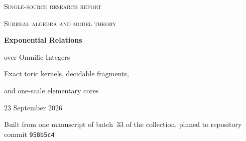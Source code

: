 \documentclass[11pt,letterpaper]{article}
\numberwithin{equation}{section}
\theoremstyle{definition}
\theoremstyle{remark}
\newcommand{\Oz}{\mathbf{Oz}}
\newcommand{\SC}{\mathbf{No}[i]}
\newcommand{\Z}{\mathbb Z}
\newcommand{\A}{\mathbb A}
\newcommand{\Qb}{\overline{\mathbb Q}}
\newcommand{\J}{\mathbb J}
\newcommand{\Ealg}{\mathcal E_{\mathrm{alg}}}
\newcommand{\Exp}{\operatorname{Exp}}
\begin{document}
\hypersetup{pageanchor=false}
\begin{titlepage}
\centering
\vspace*{0.05in}
{\large\scshape Single-source research report\par}
\vspace{0.12in}
{\large\scshape Surreal algebra and model theory\par}
\vspace{0.3in}
{\LARGE\bfseries Exponential Relations\par over Omnific Integers\par}
\vspace{0.24in}
{\large Exact toric kernels, decidable fragments,\par and one-scale elementary cores\par}
\vspace{0.32in}
{23 September 2026\par}
\vspace{0.06in}
{\small Built from one manuscript of batch~33 of the collection,
pinned to repository commit \texttt{958b5c4}\par}
\vspace{0.2in}
\begin{minipage}{0.92\textwidth}
\begin{abstract}
Let $\J$ be the purely infinite surreals, so that Conway's omnific integers are
$\Oz=\Z\oplus\J$. On the additive domain $\Ealg=\Qb+\J\subseteq\SC$, define
$\Exp(a+p)=e^a\exp(p)$. Combining Gonshor's monomial theorem with classical
Lindemann--Weierstrass gives an injective exponential group-algebra map. We derive
an exact description of all Laurent-polynomial relations among finitely many
exponentials, their transcendence degree, and the ordinary complex constants in
the field they generate.

The principal model-theoretic application concerns omnific-integer variables and
finite exponential sums with algebraic coefficients, algebraic shifts, and real
algebraic linear slopes. Their zero relations admit an effective balanced-partition
elimination. With addition, order, and congruences, the resulting first-order
language is decidable. Its rational-slope reduct is a definitional expansion of
Presburger arithmetic. The algebraic-slope structure has a definable decomposition
into ordinary Presburger integers and a nonzero ordered vector space over the real
algebraic numbers. We classify all its elementary substructures: they are exactly
$\Z+W$ for nonzero algebraic-vector subspaces $W\subseteq\J$. In particular,
$\Z+\A u$ is a countable elementary core for every positive $u\in\J$.


\end{abstract}
\end{minipage}
\end{titlepage}
\end{document}
